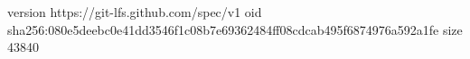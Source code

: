 version https://git-lfs.github.com/spec/v1
oid sha256:080e5deebc0e41dd3546f1c08b7e69362484ff08cdcab495f6874976a592a1fe
size 43840
